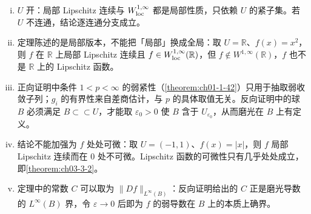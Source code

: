 \documentclass[../../main.tex]{subfiles}%
\begin{document}
\begin{remark}\label{remark:ch04-thm-4-5-条件}
\begin{enumerate}[(i)]
\item $U$ 开：局部 Lipschitz 连续与 $W^{1,\infty}_{\mathrm{loc}}$ 都是局部性质，只依赖 $U$ 的紧子集。若 $U$ 不连通，结论逐连通分支成立。
\item 定理陈述的是局部版本，不能把「局部」换成全局：取 $U=\mathbb{R}$、$f(x)=x^2$，则 $f$ 在 $\mathbb{R}$ 上局部 Lipschitz 连续且 $f\in W^{1,\infty}_{\mathrm{loc}}(\mathbb{R})$，但 $f\notin W^{1,\infty}(\mathbb{R})$，$f$ 也不是 $\mathbb{R}$ 上的 Lipschitz 函数。
\item 正向证明中条件 $1<p<\infty$ 的弱紧性（\cref{theorem:ch01-1-42}）只用于抽取弱收敛子列；$g_i$ 的有界性来自差商估计，与 $p$ 的具体取值无关。反向证明中的球 $B$ 必须满足 $B\subset\subset U$，才能取 $\varepsilon_0>0$ 使 $B$ 含于 $U_{\varepsilon_0}$，从而磨光在 $B$ 上有定义。 %
\item 结论不能加强为 $f$ 处处可微：取 $U=(-1,1)$、$f(x)=\lvert x\rvert$，则 $f$ 局部 Lipschitz 连续而在 $0$ 处不可微。Lipschitz 函数的可微性只有几乎处处成立，即\cref{theorem:ch03-3-2}。%
\item 定理中的常数 $C$ 可以取为 $\lVert Df\rVert_{L^\infty(B)}$：反向证明给出的 $C$ 正是磨光导数的 $L^\infty(B)$ 界，令 $\varepsilon\to0$ 后即为 $f$ 的弱导数在 $B$ 上的本质上确界。
\end{enumerate}
\end{remark}
\end{document}
